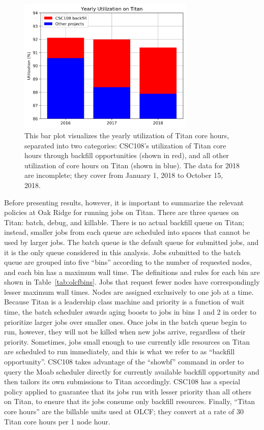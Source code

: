 \begin{figure}
  \includegraphics[width=0.75\textwidth]{images/barplot-jacks-slide.png}
\caption{This bar plot visualizes the yearly utilization of Titan core hours,
separated into two categories: CSC108's utilization of Titan core hours through
backfill opportunities (shown in red), and all other utilization of core hours
on Titan (shown in blue). The data for 2018 are incomplete; they cover from
January 1, 2018 to October 15, 2018.}
\label{fig:jacks-slide}
\end{figure}


Before presenting results, however, it is important to summarize the relevant
policies at Oak Ridge for running jobs on Titan. There are three queues on
Titan: batch, debug, and killable. There is no actual backfill queue on Titan;
instead, smaller jobs from each queue are scheduled into spaces that cannot be
used by larger jobs. The batch queue is the default queue for submitted jobs,
and it is the only queue considered in this analysis. Jobs submitted to the
batch queue are grouped into five ``bins'' according to the number of requested
nodes, and each bin has a maximum wall time. The definitions and rules for each
bin are shown in Table~\ref{tab:olcfbins}. Jobs that request fewer nodes have
correspondingly lesser maximum wall times. Nodes are assigned exclusively to
one job at a time. Because Titan is a leadership class machine and priority is
a function of wait time, the batch scheduler awards aging boosts to jobs in
bins 1 and 2 in order to prioritize larger jobs over smaller ones. Once jobs in
the batch queue begin to run, however, they will not be killed when new jobs
arrive, regardless of their priority. Sometimes, jobs small enough to use
currently idle resources on Titan are scheduled to run immediately, and this is
what we refer to as ``backfill opportunity''. CSC108 takes advantage of the
``showbf'' command in order to query the Moab scheduler directly for currently
available backfill opportunity and then tailors its own submissions to Titan
accordingly. CSC108 has a special policy applied to guarantee that its jobs run
with lesser priority than all others on Titan, to ensure that its jobs consume
only backfill resources. Finally, ``Titan core hours'' are the billable units
used at OLCF; they convert at a rate of 30 Titan core hours per 1 node hour.

